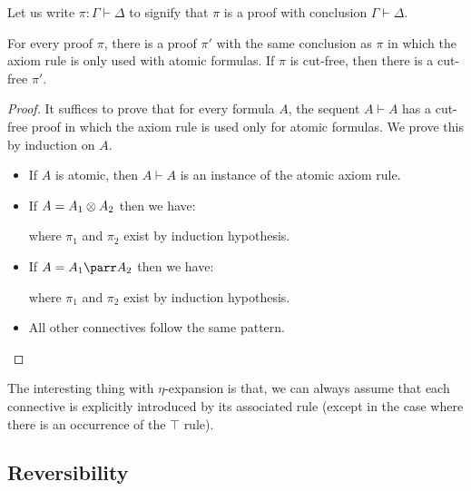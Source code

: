Let us write \(\pi:\Gamma\vdash\Delta\) to signify that \(\pi\) is a
proof with conclusion \(\Gamma\vdash\Delta\).

\begin{proposition}
For every proof $\pi$, there is a proof $\pi'$ with the
same conclusion as $\pi$ in which the axiom rule is only used with
atomic formulas.
If $\pi$ is cut-free, then there is a cut-free $\pi'$.
\end{proposition}

\begin{proof}
It suffices to prove that for every formula $A$, the sequent
$A\vdash A$ has a cut-free proof in which the axiom rule is used
only for atomic formulas.
We prove this by induction on $A$.
\begin{itemize}
\item If $A$ is atomic, then $A\vdash A$ is an instance of the atomic axiom rule.
\item If $A=A_1\tens A_2$ then we have:
\begin{prooftree}
\end{prooftree}
where $\pi_1$ and $\pi_2$ exist by induction hypothesis.
\item If $A=A_1\parr A_2$ then we have:
\begin{prooftree}
\end{prooftree}
where $\pi_1$ and $\pi_2$ exist by induction hypothesis.
\item All other connectives follow the same pattern.
\end{itemize}
\end{proof}

The interesting thing with \(\eta\)-expansion is that, we can always
assume that each connective is explicitly introduced by its associated
rule (except in the case where there is an occurrence of the \(\top\)
rule).

\subsection{Reversibility}\label{reversibility-1}

